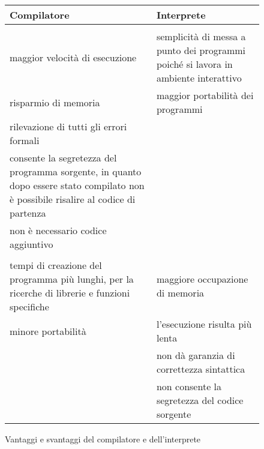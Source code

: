 \documentclass[a4paper]{extarticle}
\begin{document}
\begin{figure}[H]
  \centering
  \begin{tabularx}{\textwidth}{@{}|P|P|@{}}
    \hline
    \textbf{Compilatore} & \textbf{Interprete}\\
    \hline
    \\
    \hline
    \parbox{\linewidth}{maggior velocità di esecuzione} & \parbox{\linewidth}{\vspace{3mm} semplicità di messa a punto dei programmi poiché si lavora in ambiente interattivo \vspace{3mm}}\\
    \hline
    \parbox{\linewidth}{risparmio di memoria} & \parbox{\linewidth}{maggior portabilità dei programmi}\\
    \hline
    \parbox{\linewidth}{rilevazione di tutti gli errori formali} & \\
    \hline
    \parbox{\linewidth}{\vspace{3mm} consente la segretezza del programma sorgente, in quanto dopo essere stato compilato non è possibile risalire al codice di partenza \vspace{3mm}} & \\
    \hline
    \parbox{\linewidth}{non è necessario codice aggiuntivo} & \\
    \hline
    \\
    \hline
    \parbox{\linewidth}{\vspace{3mm} tempi di creazione del programma più lunghi, per la ricerche di librerie e funzioni specifiche \vspace{3mm}} & \parbox{\linewidth}{maggiore occupazione di memoria}\\
    \hline
    \parbox{\linewidth}{minore portabilità} & \parbox{\linewidth}{l’esecuzione risulta più lenta}\\
    \hline
     & \parbox{\linewidth}{non dà garanzia di correttezza sintattica}\\
    \hline
     & \parbox{\linewidth}{\vspace{3mm} non consente la segretezza del codice sorgente \vspace{3mm}}\\
    \hline
  \end{tabularx}
  \caption{Vantaggi e svantaggi del compilatore e dell'interprete}
  \label{fig:vantaggi_svantaggi_compilatore_interprete}
\end{figure}
\end{document}
